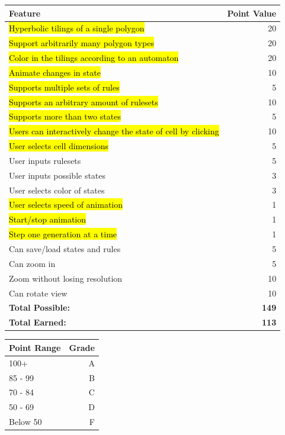 \documentclass[letterpaper,12pt]{article}
\begin{document}
\footnotesize
	\hspace{-5em}
	\begin{tabular}{ | l | r | }
	    \hline
	    \textbf{Feature} & \textbf{Point Value} \\ \hline
	    \hl{Hyperbolic tilings of a single polygon} & 20 \\ \hline
	    \hl{Support arbitrarily many polygon types} & 20 \\ \hline
	    \hl{Color in the tilings according to an automaton} & 20 \\ \hline
	    \hl{Animate changes in state} & 10 \\ \hline
	    \hl{Supports multiple sets of rules} & 5 \\ \hline
		\hl{Supports an arbitrary amount of rulesets} & 10 \\ \hline
		\hl{Supports more than two states} & 5 \\ \hline
		\hl{Users can interactively change the state of cell by clicking} & 10 \\ \hline
		\hl{User selects cell dimensions} & 5 \\ \hline
		User inputs rulesets & 5 \\ \hline
		User inputs possible states & 3 \\ \hline
		User selects color of states & 3 \\ \hline
		\hl{User selects speed of animation} & 1 \\ \hline
		\hl{Start/stop animation} & 1 \\ \hline
		\hl{Step one generation at a time} & 1 \\ \hline
		Can save/load states and rules & 5 \\ \hline
		Can zoom in & 5 \\ \hline
		Zoom without losing resolution & 10 \\ \hline
		Can rotate view & 10 \\ \hline
		\textbf{Total Possible:} & \textbf{149} \\ \hline
		\textbf{Total Earned:} & \textbf{113} \\ \hline
	\end{tabular}
\quad
\footnotesize
\begin{tabular}{ | l | r | }
    \hline
    \textbf{Point Range} & \textbf{Grade} \\ \hline
    100+ & A \\ \hline
    85 - 99 & B \\ \hline
    70 - 84 & C \\ \hline
    50 - 69 & D \\ \hline
    Below 50 & F \\ \hline

 \end{tabular}
\end{document}
